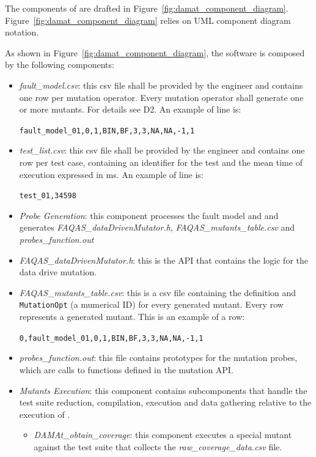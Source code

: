 The components of \dama are drafted in Figure~\ref{fig:damat_component_diagram}. Figure~\ref{fig:damat_component_diagram} relies on UML component diagram notation.

As shown in Figure~\ref{fig:damat_component_diagram}, the software is composed by the following components:

\begin{itemize}
  \item \textit{fault\_model.csv}: this csv file shall be provided by the engineer and contains one row per mutation operator. Every mutation operator shall generate one or more mutants.
  For details see D2. An example of line is:

  \texttt{fault\_model\_01,0,1,BIN,BF,3,3,NA,NA,-1,1}

  \item \textit{test\_list.csv}: this csv file shall be provided by the engineer and contains one row per test case, containing an identifier for the test and the mean time of execution expressed in ms. An example of line is:

  \texttt{test\_01,34598}

  \item \textit{Probe  Generation}: this component processes the fault model and and generates \textit{FAQAS\_dataDrivenMutator.h}, \textit{FAQAS\_mutants\_table.csv}  and \textit{probes\_function.out}
  \item \textit{FAQAS\_dataDrivenMutator.h}: this is the API that contains the logic for the data drive mutation.
  \item \textit{FAQAS\_mutants\_table.csv}: this is a csv file containing the definition and \texttt{MutationOpt} (a mumerical ID) for every generated mutant. Every row represents a generated mutant. This is an example of a row:

  \texttt{0,fault\_model\_01,0,1,BIN,BF,3,3,NA,NA,-1,1}

  \item \textit{probes\_function.out}: this file contains prototypes for the mutation probes, which are calls to functions defined in the mutation API.
  \item \textit{Mutants Execution}: this component contains subcomponents that handle the test suite reduction, compilation, execution and data gathering relative to the execution of \dama.
  \begin{itemize}
    \item \textit{DAMAt\_obtain\_coverage}: this component executes a special mutant against the test suite that collects the \textit{raw\_coverage\_data.csv} file.


\end{itemize}
\end{itemize}
